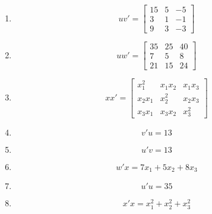 \documentclass[11pt]{article} %
\begin{document}
\begin{enumerate}
\item $$uv'=
\begin{bmatrix}
	15&5&-5\\
	3&1&-1\\
	9&3&-3
\end{bmatrix}$$
\item $$uw'=
\begin{bmatrix}
	35&25&40\\
	7&5&8\\
	21&15&24
\end{bmatrix}$$
\item $$xx'=
\begin{bmatrix}
	x_1^2&x_1x_2&x_1x_3\\
	x_2x_1&x_2^2&x_2x_3\\
	x_3x_1&x_3x_2&x_3^2
\end{bmatrix}$$
\item $$v'u=13$$
\item $$u'v=13$$
\item $$w'x=7x_1+5x_2+8x_3$$
\item $$u'u=35$$
\item $$x'x=x_1^2+x_2^2+x_3^2$$
\end{enumerate}

	
	
	
	
	
	
\end{document}
